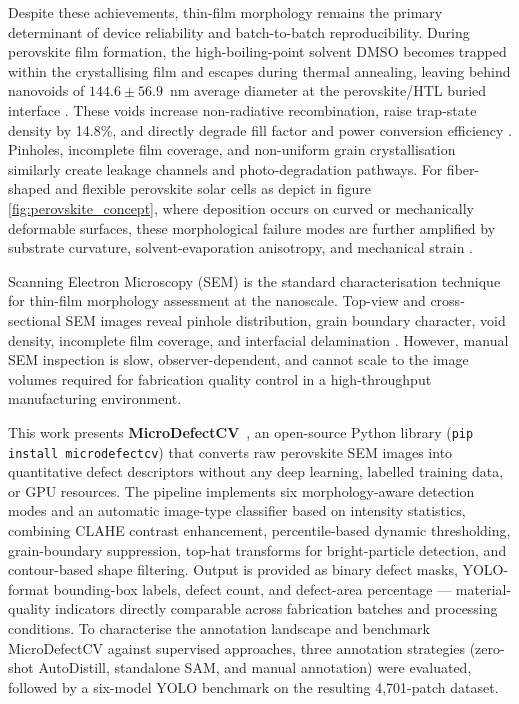 \documentclass[pdflatex,sn-mathphys-num,iicol]{sn-jnl}
\theoremstyle{thmstyleone}
\theoremstyle{thmstyletwo}
\theoremstyle{thmstylethree}
\begin{document}
Despite these achievements, thin-film morphology remains the
primary determinant of device reliability and batch-to-batch
reproducibility. During perovskite film formation, the high-boiling-point
solvent DMSO becomes trapped within the crystallising film and escapes
during thermal annealing, leaving behind nanovoids of
$144.6 \pm 56.9$~nm average diameter at the perovskite/HTL buried
interface \cite{chang2026,chen2021}. These voids increase
non-radiative recombination, raise trap-state density by 14.8\%,
and directly degrade fill factor and power conversion efficiency
\cite{chang2026}. Pinholes, incomplete film coverage, and non-uniform
grain crystallisation similarly create leakage channels and
photo-degradation pathways. For fiber-shaped and flexible
perovskite solar cells as depict in figure \ref{fig:perovskite_concept}, where deposition occurs on curved or
mechanically deformable surfaces, these morphological failure modes
are further amplified by substrate curvature, solvent-evaporation
anisotropy, and mechanical strain
\cite{balilonda2019,hu2016,qiu2016,diGiacomo2016}.

Scanning Electron Microscopy (SEM) is the standard characterisation
technique for thin-film morphology assessment at the nanoscale.
Top-view and cross-sectional SEM images reveal pinhole distribution,
grain boundary character, void density, incomplete film coverage,
and interfacial delamination \cite{chang2026,zheng2025}. However,
manual SEM inspection is slow, observer-dependent, and cannot scale
to the image volumes required for fabrication quality control in a
high-throughput manufacturing environment.

This work presents \textbf{MicroDefectCV}~\cite{microdefectcv2025},
an open-source Python library (\texttt{pip install microdefectcv})
that converts raw perovskite SEM images into quantitative defect
descriptors without any deep learning, labelled training data, or
GPU resources. The pipeline implements six morphology-aware detection
modes and an automatic image-type classifier based on intensity
statistics, combining CLAHE contrast enhancement, percentile-based
dynamic thresholding, grain-boundary suppression, top-hat transforms
for bright-particle detection, and contour-based shape filtering.
Output is provided as binary defect masks, YOLO-format bounding-box
labels, defect count, and defect-area percentage --- material-quality
indicators directly comparable across fabrication batches and
processing conditions. To characterise the annotation landscape and
benchmark MicroDefectCV against supervised approaches, three
annotation strategies (zero-shot AutoDistill, standalone SAM, and
manual annotation) were evaluated, followed by a six-model YOLO
benchmark on the resulting 4{,}701-patch dataset.
\end{document}
